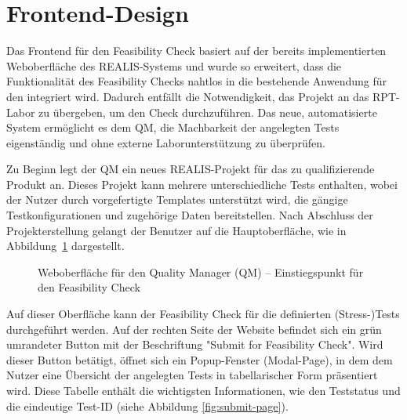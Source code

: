 \section{Frontend-Design}
Das Frontend für den Feasibility Check basiert auf der bereits implementierten Weboberfläche des \gls{REALIS}-Systems und wurde so erweitert, dass die Funktionalität des Feasibility Checks nahtlos in die bestehende Anwendung für den  integriert wird. Dadurch entfällt die Notwendigkeit, das Projekt an das \gls{RPT}-Labor zu übergeben, um den Check durchzuführen. Das neue, automatisierte System ermöglicht es dem \gls{QM}, die Machbarkeit der angelegten Tests eigenständig und ohne externe Laborunterstützung zu überprüfen.

Zu Beginn legt der \gls{QM} ein neues \gls{REALIS}-Projekt für das zu qualifizierende Produkt an. Dieses Projekt kann mehrere unterschiedliche Tests enthalten, wobei der Nutzer durch vorgefertigte Templates unterstützt wird, die gängige Testkonfigurationen und zugehörige Daten bereitstellen. Nach Abschluss der Projekterstellung gelangt der Benutzer auf die Hauptoberfläche, wie in Abbildung~\ref{fig:whole-page} dargestellt.

\begin{figure}[!htbp] 
    \centering 
    \caption{Weboberfläche für den Quality Manager (QM) – Einstiegspunkt für den Feasibility Check} 
    \label{fig:whole-page} 
\end{figure}

Auf dieser Oberfläche kann der Feasibility Check für die definierten (Stress-)Tests durchgeführt werden. Auf der rechten Seite der Website befindet sich ein grün umrandeter Button mit der Beschriftung "Submit for Feasibility Check". Wird dieser Button betätigt, öffnet sich ein Popup-Fenster (Modal-Page), in dem dem Nutzer eine Übersicht der angelegten Tests in tabellarischer Form präsentiert wird. Diese Tabelle enthält die wichtigsten Informationen, wie den Teststatus und die eindeutige Test-ID (siehe Abbildung \ref{fig:submit-page}).

